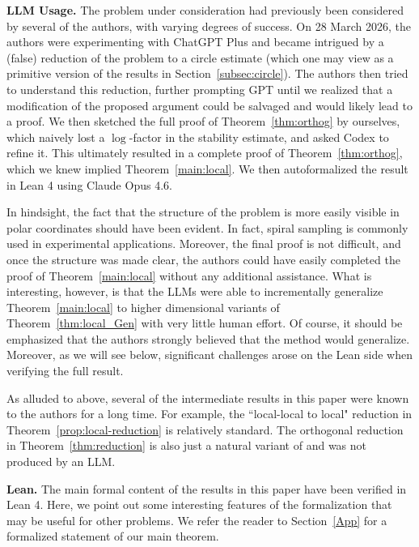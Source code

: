\documentclass[11pt]{amsart}
\theoremstyle{remark}
\begin{document}
\textbf{LLM Usage.} The problem under consideration had previously been considered by several of the authors, with varying degrees of success. On 28 March 2026, the authors were experimenting with ChatGPT Plus and became intrigued by a (false) reduction of the problem to a circle estimate (which one may view as a primitive version of the results in Section~\ref{subsec:circle}). The authors then tried to understand this reduction, further prompting GPT until we realized that a modification of the proposed argument could be salvaged and would likely lead to a proof. We then sketched the full proof of Theorem~\ref{thm:orthog} by ourselves, which naively lost a $\log$-factor in the stability estimate, and asked Codex to refine it. This ultimately resulted in a complete proof of Theorem~\ref{thm:orthog}, which we knew implied Theorem~\ref{main:local}. We then autoformalized the result in Lean 4 using Claude Opus 4.6.
\medskip


In hindsight, the fact that the structure of the problem is more easily visible in polar coordinates should have been evident. In fact, spiral sampling is commonly used in experimental applications. Moreover, the final proof is not difficult, and once the structure was made clear, the authors could have easily completed the proof of  Theorem~\ref{main:local}  without any additional assistance. What is interesting, however, is that the LLMs were able to incrementally generalize Theorem~\ref{main:local} to higher dimensional variants of Theorem~\ref{thm:local_Gen} with very little human effort. Of course, it should be emphasized that the authors strongly believed that the method would generalize. Moreover, as we will see below, significant challenges arose on the Lean side when verifying the full result.
\medskip

As alluded to above, several of the intermediate results in this paper were known to the authors for a long time. For example, the ``local-local to local" reduction in Theorem~\ref{prop:local-reduction} is relatively standard. The orthogonal reduction in Theorem~\ref{thm:reduction}  is also just a natural variant of \cite[Theorem 3.10]{MR4800909} and was not produced by an LLM.
\medskip

\textbf{Lean.} The main formal content of the results in this paper have been verified in Lean 4. Here, we point out some interesting features of the formalization that may be useful for other problems. We refer the reader to Section~\ref{App} for a formalized statement of our main theorem.
\medskip
\end{document}
